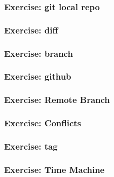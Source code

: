 \documentclass[14pt]{beamer}
\begin{document}
\begin{frame}\frametitle{Exercise: git local repo}

\end{frame}

\begin{frame}\frametitle{Exercise: diff}

\end{frame}

\begin{frame}\frametitle{Exercise: branch}

\end{frame}

\begin{frame}\frametitle{Exercise: github}

\end{frame}

\begin{frame}\frametitle{Exercise: Remote Branch}

\end{frame}

\begin{frame}\frametitle{Exercise: Conflicts}

\end{frame}

\begin{frame}\frametitle{Exercise: tag}

\end{frame}

\begin{frame}\frametitle{Exercise: Time Machine}

\end{frame}
\end{document}
